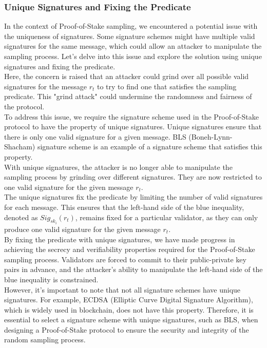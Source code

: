 \subsubsection{Unique Signatures and Fixing the Predicate}
In the context of Proof-of-Stake sampling, we encountered a potential issue with the uniqueness of signatures. Some signature schemes might have multiple valid signatures for the same message, which could allow an attacker to manipulate the sampling process. Let's delve into this issue and explore the solution using unique signatures and fixing the predicate.\\
Here, the concern is raised that an attacker could grind over all possible valid signatures for the message $r_t$ to try to find one that satisfies the sampling predicate. This "grind attack" could undermine the randomness and fairness of the protocol.\\
To address this issue, we require the signature scheme used in the Proof-of-Stake protocol to have the property of unique signatures. Unique signatures ensure that there is only one valid signature for a given message. BLS (Boneh-Lynn-Shacham) signature scheme is an example of a signature scheme that satisfies this property.\\
With unique signatures, the attacker is no longer able to manipulate the sampling process by grinding over different signatures. They are now restricted to one valid signature for the given message $r_t$.\\
The unique signatures fix the predicate by limiting the number of valid signatures for each message. This ensures that the left-hand side of the blue inequality, denoted as $Sig_{sk_i}(r_t)$, remains fixed for a particular validator, as they can only produce one valid signature for the given message $r_t$.\\
By fixing the predicate with unique signatures, we have made progress in achieving the secrecy and verifiability properties required for the Proof-of-Stake sampling process. Validators are forced to commit to their public-private key pairs in advance, and the attacker's ability to manipulate the left-hand side of the blue inequality is constrained.\\
However, it's important to note that not all signature schemes have unique signatures. For example, ECDSA (Elliptic Curve Digital Signature Algorithm), which is widely used in blockchain, does not have this property. Therefore, it is essential to select a signature scheme with unique signatures, such as BLS, when designing a Proof-of-Stake protocol to ensure the security and integrity of the random sampling process.

